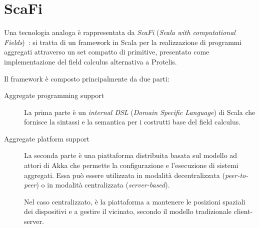 
\section{ScaFi}\label{sec:scafi}

Una tecnologia analoga è rappresentata da \emph{ScaFi} (\emph{\emph{Sca}la with computational \emph{Fi}elds})~\cite{aggregatescala-pmldc2016}:
si tratta di un framework in Scala per la realizzazione di programmi aggregati attraverso un set compatto di primitive, presentato come implementazione del field calculus alternativa a Protelis.

Il framework è composto principalmente da due parti:

\begin{description}
  \item[Aggregate programming support]
    La prima parte è un \emph{internal DSL} (\emph{Domain Specific Language}) di Scala che fornisce la sintassi e la semantica per i costrutti base del field calculus.

  \item[Aggregate platform support]
    La seconda parte è una piattaforma distribuita basata sul modello ad attori di Akka che permette la configurazione e l'esecuzione di sistemi aggregati.
    Essa può essere utilizzata in modalità decentralizzata (\emph{peer-to-peer}) %
    o in modalità centralizzata (\emph{server-based}).%



    Nel caso centralizzato, è la piattaforma a mantenere le posizioni spaziali dei dispositivi e a gestire il vicinato, secondo il modello tradizionale client-server.
\end{description}

